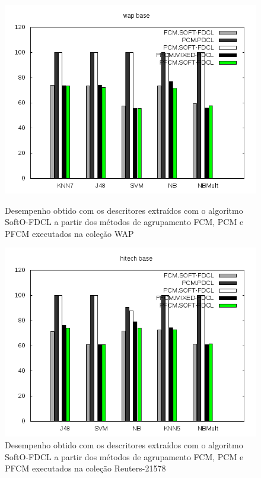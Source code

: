 \begin{figure}[!htp] \centering 
   \begin{minipage}{0.45\textwidth} 
     \centering
    \includegraphics[width=1.0\columnwidth]{assets/pdcl/wap} 
    \caption{Desempenho obtido com os descritores extraídos com o algoritmo SoftO-FDCL a partir dos
      métodos de agrupamento FCM,
    PCM e PFCM executados na coleção WAP} 
    \label{fig:pfcmwap}
  \end{minipage}\hfill 
  \begin{minipage}{0.45\textwidth} \centering
    \includegraphics[width=1.0\columnwidth]{assets/pdcl/hitech} 
    \caption{Desempenho obtido com os descritores extraídos com o algoritmo SoftO-FDCL a partir dos
      métodos de agrupamento FCM,
    PCM e PFCM executados na coleção Reuters-21578} 
     \label{fig:pfcmreuters} 
   \end{minipage} 
\end{figure}

